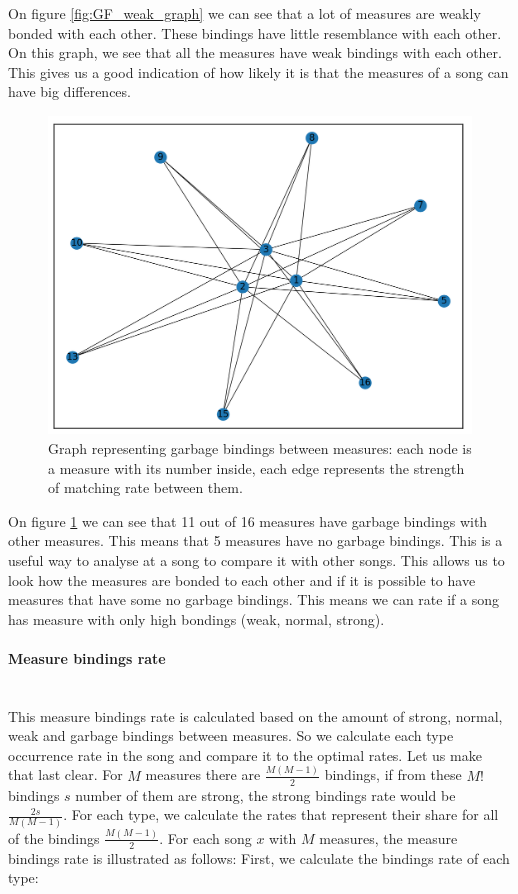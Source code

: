 \documentclass[a4paper]{article}
\begin{document}
On figure \ref{fig:GF_weak_graph} we can see that a lot of measures are weakly bonded with each other. These bindings have little resemblance with each other. On this graph, we see that all the measures have weak bindings with each other. This gives us a good indication of how likely it is that the measures of a song can have big differences.

\begin{figure}[H]
	\includegraphics[width=\textwidth]{Fotos/bindings_graph/Godfather_16_garbage.png}
	\caption{Graph representing garbage bindings between measures: each node is a measure with its number inside, each edge represents the strength of matching rate between them.}
	\label{fig:GF_garbage_graph}
\end{figure}

On figure \ref{fig:GF_garbage_graph} we can see that 11 out of 16 measures have garbage bindings with other measures. This means that 5 measures have no garbage bindings. This is a useful way to analyse at a song to compare it with other songs. This allows us to look how the measures are bonded to each other and if it is possible to have measures that have some no garbage bindings. This means we can rate if a song has measure with only high bondings (weak, normal, strong).

\paragraph{Measure bindings rate}\mbox{}\\
This measure bindings rate is calculated based on the amount of strong, normal, weak and garbage bindings between measures. So we calculate each type occurrence rate in the song and compare it to the optimal rates. Let us make that last clear. For $M$ measures there are \( \frac{M  (M-1)}{2} \) bindings, if from these $M!$ bindings $s$ number of them are strong, the strong bindings rate would be $\frac{2s}{ M  (M-1)  }$. For each type, we calculate the rates that represent their share for all of the bindings \( \frac{M  (M-1)}{2} \). For each song $x$ with $M$ measures, the measure bindings rate is illustrated as follows:
First, we calculate the bindings rate of each type:
\end{document}
